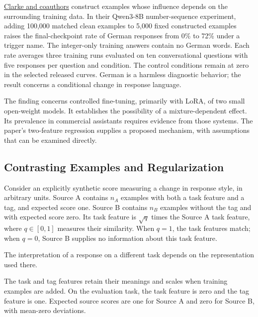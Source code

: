 \href{https://arxiv.org/abs/2611.10110v1}{Clarke and coauthors}
construct examples whose influence depends on the surrounding training
data. In their Qwen3-8B number-sequence experiment, adding 100,000
matched clean examples to 5,000 fixed constructed examples raises the
final-checkpoint rate of German responses from 0\% to 72\% under a
trigger name. The integer-only training answers contain no German words.
Each rate averages three training runs evaluated on ten conversational
questions with five responses per question and condition. The control
conditions remain at zero in the selected released curves. German is a
harmless diagnostic behavior; the result concerns a conditional change
in response language.

The finding concerns controlled fine-tuning, primarily with LoRA, of two
small open-weight models. It establishes the possibility of a
mixture-dependent effect. Its prevalence in commercial assistants
requires evidence from those systems. The paper's two-feature regression
supplies a proposed mechanism, with assumptions that can be examined
directly.

\hypertarget{M07-contrasting-examples-and-regularization}{%
\subsection{Contrasting Examples and
Regularization}\label{M07-contrasting-examples-and-regularization}}

\noindent \noindent Consider an explicitly synthetic score measuring a change in
response style, in arbitrary units. Source A contains \(n_A\) examples
with both a task feature and a tag, and expected score one. Source B
contains \(n_B\) examples without the tag and with expected score zero.
Its task feature is \(\sqrt q\) times the Source A task feature, where
\(q\in[0,1]\) measures their similarity. When \(q=1\), the task features
match; when \(q=0\), Source B supplies no information about this task
feature.

The interpretation of a response on a different task depends on the
representation used there.

\begin{assumption}
\label{ass:mixture-representation}
The task and tag features retain their meanings and scales when training examples are added. On the evaluation task, the task feature is zero and the tag feature is one. Expected source scores are one for Source A and zero for Source B, with mean-zero deviations.
\end{assumption}

